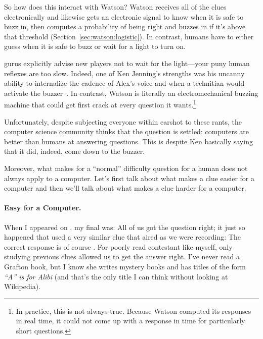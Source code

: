 So how does this interact with Watson?
%
Watson receives all of the clues electronically and likewise gets an
electronic signal to know when it is safe to buzz in, then computes a
probability of being right and buzzes in if it's above that threshold
(Section~\ref{sec:watson:logistic}).
%
In contrast, humans have to either guess when it is safe to buzz or
wait for a light to turn on.


\jeopardy{} gurus explicitly advise new players not to wait for the light---your puny human reflexes are too slow.
%
Indeed, one of Ken Jenning's strengths was his uncanny ability to
internalize the cadence of Alex's voice and when a technitian would
activate the buzzer~\citep{jennings-06}.
%
In contrast, Watson is literally an electromechanical buzzing machine
that could get first crack at every question it wants.\footnote{In
practice, this is not always true.  Because Watson computed its
responses in real time, it could not come up with a response in time
for particularly short questions.}

Unfortunately, despite subjecting everyone within earshot to these
rants, the computer science community thinks that the question is
settled: computers are better than humans at answering questions.
%
This is despite Ken basically saying that it did, indeed, come down to
the buzzer.

Moreover, what makes for a ``normal'' difficulty question for a human
does not always apply to a computer.
%
Let's first talk about what makes a clue easier for a computer and
then we'll talk about what makes a clue harder for a computer.

\paragraph{Easy for a Computer.}

When I appeared on \jeopardy{}, my final \jeopardy{} was:
%
All of us got the question right; it just so happened that \jeopardy{}
used a very similar clue that aired as we were recording:
%
%
The correct response is of course .
%
For poorly read contestant like myself, only studying previous clues
allowed us to get the answer right.
%
I've never read a Grafton book, but I know she writes mystery books and
has titles of the form \textit{``A'' is for Alibi} (and that's the
only title I can think without looking at Wikipedia).

